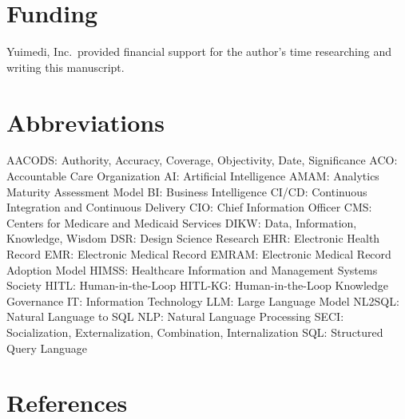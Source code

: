 \documentclass[
  american,
  11pt,
  letterpaper,
  oneside  ,captions=tableheading
]{scrartcl}
\begin{document}
\section{Funding}\label{funding}

Yuimedi, Inc.~provided financial support for the author's time
researching and writing this manuscript.

\section{Abbreviations}\label{abbreviations}

AACODS: Authority, Accuracy, Coverage, Objectivity, Date, Significance
ACO: Accountable Care Organization AI: Artificial Intelligence AMAM:
Analytics Maturity Assessment Model BI: Business Intelligence CI/CD:
Continuous Integration and Continuous Delivery CIO: Chief Information
Officer CMS: Centers for Medicare and Medicaid Services DIKW: Data,
Information, Knowledge, Wisdom DSR: Design Science Research EHR:
Electronic Health Record EMR: Electronic Medical Record EMRAM:
Electronic Medical Record Adoption Model HIMSS: Healthcare Information
and Management Systems Society HITL: Human-in-the-Loop HITL-KG:
Human-in-the-Loop Knowledge Governance IT: Information Technology LLM:
Large Language Model NL2SQL: Natural Language to SQL NLP: Natural
Language Processing SECI: Socialization, Externalization, Combination,
Internalization SQL: Structured Query Language

\section{References}\label{references}
\end{document}
